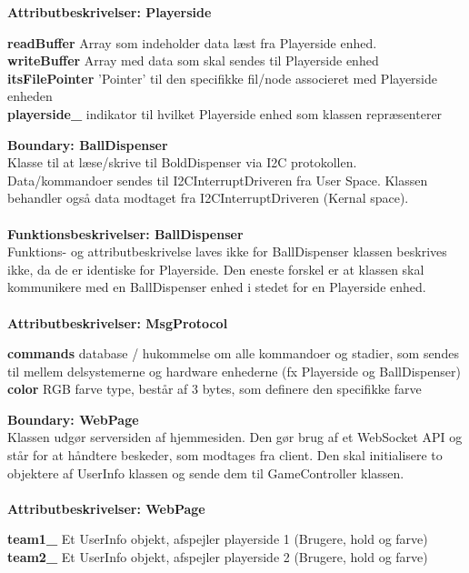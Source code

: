 \documentclass[Arkitektur/System_main.tex]{subfiles}
\begin{document}
{\large\textbf{Attributbeskrivelser: Playerside}}
\begin{adjustwidth}{1cm}{0pt}
\textbf{readBuffer} Array som indeholder data læst fra Playerside enhed. \\[0.2cm]
\textbf{writeBuffer} Array med data som skal sendes til Playerside enhed \\[0.2cm]
\textbf{itsFilePointer} 'Pointer' til den specifikke fil/node associeret med Playerside enheden\\[0.2cm]
\textbf{playerside\_} indikator til hvilket Playerside enhed som klassen repræsenterer\\[0.2cm]
\end{adjustwidth}
\textbf{Boundary:  BallDispenser}\\
Klasse til at læse/skrive til BoldDispenser via I2C protokollen. Data/kommandoer sendes til I2CInterruptDriveren fra User Space. Klassen behandler også data modtaget fra I2CInterruptDriveren (Kernal space). \\\\
{\large\textbf{Funktionsbeskrivelser: BallDispenser}}\\[0.2cm]
Funktions- og attributbeskrivelse laves ikke for BallDispenser klassen beskrives ikke, da de er identiske for Playerside. Den eneste forskel er at klassen skal kommunikere med en BallDispenser enhed i stedet for en Playerside enhed. \\\\
{\large\textbf{Attributbeskrivelser: MsgProtocol}}
\begin{adjustwidth}{1cm}{0pt}
\textbf{commands} database / hukommelse om alle kommandoer og stadier, som sendes til mellem delsystemerne og hardware enhederne (fx Playerside og BallDispenser)\\[0.2cm]
\textbf{color} RGB farve type, består af 3 bytes, som definere den specifikke farve\\[0.2cm]
\end{adjustwidth}
{\large\textbf{Boundary: WebPage}}\\
Klassen udgør serversiden af hjemmesiden. Den gør brug af et WebSocket API og står for at håndtere beskeder, som modtages fra
client. Den skal initialisere to objektere af UserInfo klassen og sende dem til GameController klassen.\\
\\{\large\textbf{Attributbeskrivelser: WebPage}}
\begin{adjustwidth}{1cm}{0pt}
\textbf{team1\_} Et UserInfo objekt, afspejler playerside 1 (Brugere, hold og farve) \\[0.2cm]
\textbf{team2\_} Et UserInfo objekt, afspejler playerside 2 (Brugere, hold og farve) \\[0.2cm]
\end{adjustwidth}
\end{document}
